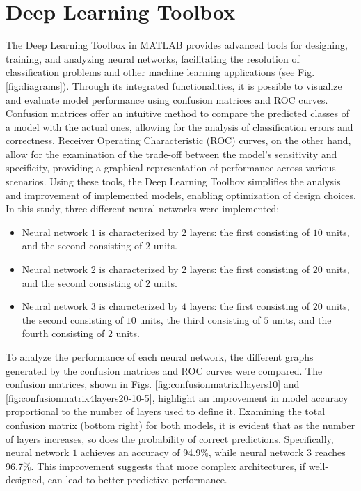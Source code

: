\documentclass[9pt,technote]{IEEEtran}
\begin{document}
\section{Deep Learning Toolbox}
The Deep Learning Toolbox in MATLAB provides advanced tools for designing, training, and analyzing neural networks, facilitating the resolution of classification problems and other machine learning applications (see Fig. \ref{fig:diagrams}). Through its integrated functionalities, it is possible to visualize and evaluate model performance using confusion matrices and ROC curves.
Confusion matrices offer an intuitive method to compare the predicted classes of a model with the actual ones, allowing for the analysis of classification errors and correctness. Receiver Operating Characteristic (ROC) curves, on the other hand, allow for the examination of the trade-off between the model's sensitivity and specificity, providing a graphical representation of performance across various scenarios. Using these tools, the Deep Learning Toolbox simplifies the analysis and improvement of implemented models, enabling optimization of design choices.
In this study, three different neural networks were implemented:
\begin{itemize}
	\item Neural network $1$ is characterized by $2$ layers: the first consisting of $10$ units, and the second consisting of $2$ units.
	\item Neural network $2$ is characterized by $2$ layers: the first consisting of $20$ units, and the second consisting of $2$ units.
	\item Neural network $3$ is characterized by $4$ layers: the first consisting of $20$ units, the second consisting of $10$ units, the third consisting of $5$ units, and the fourth consisting of $2$ units.
\end{itemize}
To analyze the performance of each neural network, the different graphs generated by the confusion matrices and ROC curves were compared.
The confusion matrices, shown in Figs. \ref{fig:confusionmatrix1layers10} and \ref{fig:confusionmatrix4layers20-10-5}, highlight an improvement in model accuracy proportional to the number of layers used to define it. Examining the total confusion matrix (bottom right) for both models, it is evident that as the number of layers increases, so does the probability of correct predictions. Specifically, neural network $1$ achieves an accuracy of 94.9$\%$, while neural network $3$ reaches 96.7$\%$. This improvement suggests that more complex architectures, if well-designed, can lead to better predictive performance.
\end{document}
